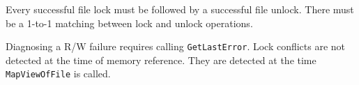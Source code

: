Every successful file lock must be followed by a successful file unlock. There must be a 1-to-1 matching between lock and unlock operations.

Diagnosing a R/W failure requires calling \texttt{GetLastError}. Lock conflicts are not detected at the time of memory reference. They are detected at the time \texttt{MapViewOfFile} is called.